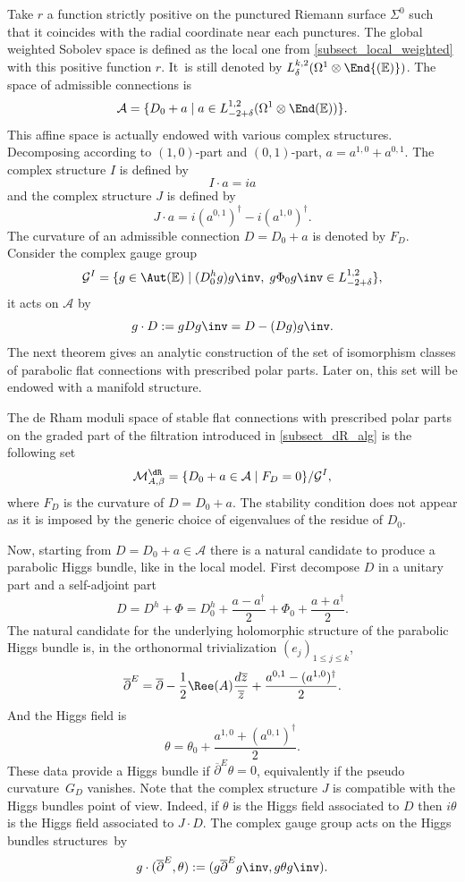 Take $r$ a function strictly positive on the punctured Riemann surface $\Sigma^0$ such that it coincides with the radial coordinate near each punctures. The global weighted Sobolev space is defined as the local one from \ref{subsect_local_weighted} with this positive function $r$. It~is still denoted by $L^{k,2}_{\delta}(\Omega^1\otimes \End{(\mathbb{E})})$. The space of admissible connections is
\[
\mathcal{A} =\lbrace D_0 + a \mid a \in L^{1,2}_{-2+\delta}(\Omega^1\otimes \End(\mathbb{E}))\rbrace.
\]
This affine space is actually endowed with various complex structures. Decomposing according to $(1,0)$-part and $(0,1)$-part, $a=a^{1,0}+a^{0,1}$. The complex structure $I$ is defined by
\[
I\cdot a = i a
\]
and the complex structure $J$ is defined by
\[
J\cdot a = i(a^{0,1})^{\dagger}-i(a^{1,0})^{\dagger}.
\]
The curvature of an admissible connection $D=D_0 + a$ is denoted by $F_D$. Consider the complex gauge group
\[
\mathcal{G}^I=\lbrace g\in\Aut(\mathbb{E}) \mid (D_0^h g) g\inv, \; g \Phi_0 g\inv \in L^{1,2}_{-2+\delta}\rbrace,
\]
it acts on $ \mathcal{A}$ by
\[
g\cdot D := g D g\inv = D -(D g)g\inv.
\]
The next theorem gives an analytic construction of the set of isomorphism classes of parabolic flat connections with prescribed polar parts. Later on, this set will be endowed with a manifold structure.

\begin{theorem}
The de Rham moduli space of stable flat connections with prescribed polar parts on the graded part of the filtration introduced in \ref{subsect_dR_alg} is the following set
\[
\mathcal{M}^{\dR}_{A, \beta} =\lbrace D_0 + a \in \mathcal{A} \mid F_D =0\rbrace/ \mathcal{G}^{I},
\]
where $F_D$ is the curvature of $D=D_0+a$. The stability condition does not appear as it is imposed by the generic choice of eigenvalues of the residue of $D_0$.
\end{theorem}

Now, starting from $ D=D_0 +a \in \mathcal{A}$ there is a natural candidate to produce a parabolic Higgs bundle, like in the local model. First decompose $D$ in a unitary part and a self-adjoint part
\[
D =D^h + \Phi= D_0^h +\frac{a-a^{\dagger}}{2} + \Phi_0 + \frac{ a + a^{\dagger}}{2}.
\]
The natural candidate for the underlying holomorphic structure of the parabolic Higgs bundle is, in the orthonormal trivialization $(e_j)_{1\le j \le k}$,
\[
\overline{\partial}^E = \overline{\partial} - \frac{1}{2} \Ree(A) \frac{d\overline{z}}{\overline{z}} + \frac{a^{0,1}-(a^{1,0})^{\dagger}}{2}.
\]
And the Higgs field is
\[
\theta = \theta_0 + \frac{a^{1,0} + (a^{0,1})^{\dagger}}{2}.
\]
These data provide a Higgs bundle if $\overline{\partial}^E \theta =0$, equivalently if the pseudo curvature~$G_D$ vanishes. Note that the complex structure $J$ is compatible with the Higgs bundles point of view. Indeed, if $\theta$ is the Higgs field associated to $D$ then $i \theta$ is the Higgs field associated to $J\cdot D$. The complex gauge group acts on the Higgs bundles structures~by
\[
g\cdot(\overline{\partial}^E,\theta) :=(g \overline{\partial}^E g\inv,g \theta g\inv).
\]

